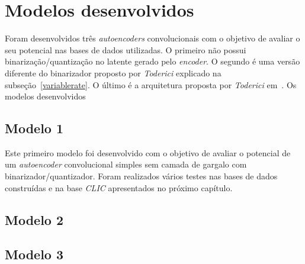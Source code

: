 \section{Modelos desenvolvidos}
Foram desenvolvidos três \textit{autoencoders} convolucionais com o objetivo de avaliar o seu potencial nas bases de dados utilizadas. O primeiro não possui binarização/quantização no latente gerado pelo \textit{encoder}. O segundo é uma versão diferente do binarizador proposto por \textit{Toderici} explicado na subseção~\ref{variablerate}. O último é a arquitetura proposta por \textit{Toderici} em~\cite{toderici2015variable}. Os modelos desenvolvidos 
\subsection{Modelo 1}
Este primeiro modelo foi desenvolvido com o objetivo de avaliar o potencial de um \textit{autoencoder} convolucional simples sem camada de gargalo com binarizador/quantizador. Foram realizados vários testes nas bases de dados construídas e na base \textit{CLIC} apresentados no próximo capítulo. 
\subsection{Modelo 2}

\subsection{Modelo 3}